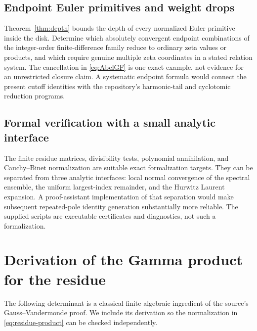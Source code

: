 \documentclass[11pt,letterpaper]{article}
\numberwithin{equation}{section}
\theoremstyle{definition}\newtheorem{definition}[theorem]{Definition}
\theoremstyle{remark}\newtheorem{remark}[theorem]{Remark}
\begin{document}
\subsection{Endpoint Euler primitives and weight drops}
Theorem~\ref{thm:depth} bounds the depth of every normalized Euler
primitive inside the disk. Determine which absolutely convergent endpoint
combinations of the integer-order finite-difference family reduce to
ordinary zeta values or products, and which require genuine multiple
zeta coordinates in a stated relation system. The cancellation in
\eqref{eq:AbelGF} is one exact example, not evidence for an unrestricted
closure claim. A systematic endpoint formula would connect the present
cutoff identities with the repository's harmonic-tail and cyclotomic
reduction programs.

\subsection{Formal verification with a small analytic interface}
The finite residue matrices, divisibility tests, polynomial annihilation,
and Cauchy--Binet normalization are suitable exact formalization targets.
They can be separated from three analytic interfaces: local normal
convergence of the spectral ensemble, the uniform largest-index remainder,
and the Hurwitz Laurent expansion. A proof-assistant implementation of
that separation would make subsequent repeated-pole identity generation
substantially more reliable. The supplied scripts are executable
certificates and diagnostics, not such a formalization.

\appendix
\section{Derivation of the Gamma product for the residue}
\label{app:product}

The following determinant is a classical finite algebraic ingredient of
the source's Gauss--Vandermonde proof. We include its derivation so the
normalization in \eqref{eq:residue-product} can be checked independently.
\end{document}
